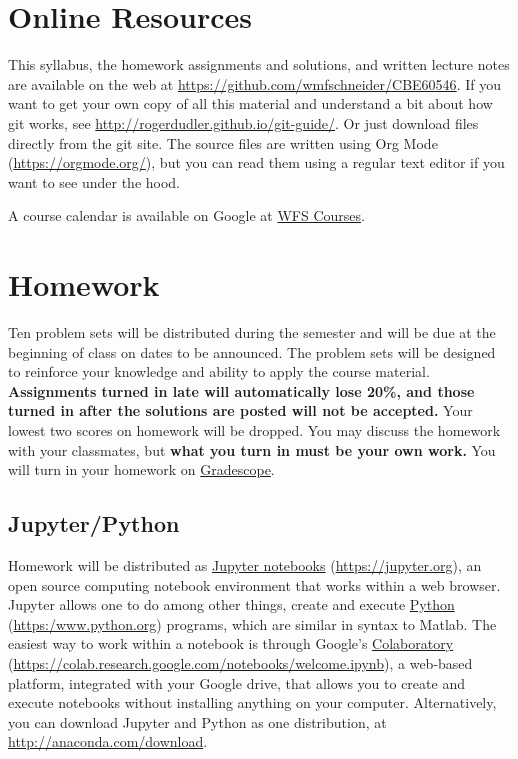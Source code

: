 \documentclass[11pt]{article}
\begin{document}
\section{Online Resources}
\label{sec:orgb748ad3}
This syllabus, the homework assignments and solutions, and written lecture notes are available on the web at \url{https://github.com/wmfschneider/CBE60546}.  If you want to get your own copy of all this material and understand a bit about how git works, see \url{http://rogerdudler.github.io/git-guide/}.  Or just download files directly from the git site. The source files are written using Org Mode (\url{https://orgmode.org/}), but you can read them using a regular text editor if you want to see under the hood.

A course calendar is available on Google at \href{https://calendar.google.com/calendar/b/1?cid=NWJwN2pmMjI5bTdoYmFvM2R0cXM2NjYzOThAZ3JvdXAuY2FsZW5kYXIuZ29vZ2xlLmNvbQ}{WFS Courses}.
\section{Homework}
\label{sec:org1335114}
Ten problem sets will be distributed during the semester and will be due at the beginning of class on dates to be announced. The problem sets will be designed to reinforce your knowledge and ability to apply the course material.  \textbf{Assignments turned in late will automatically lose 20\%, and those turned in after the solutions are posted will not be accepted.}  Your lowest two scores on homework will be dropped.  You may discuss the homework with your classmates, but \textbf{what you turn in must be your own work.} You will turn in your homework on \href{https://www.gradescope.com/courses/933965}{Gradescope}.
\subsection{Jupyter/Python}
\label{sec:orgace344b}
Homework will be distributed as \href{https://jupyter.org/}{Jupyter notebooks} (\url{https://jupyter.org}), an open source computing notebook environment that works within a web browser. Jupyter allows one to do among other things, create and execute \href{https://www.python.org/}{Python} (\url{https:/www.python.org}) programs, which are similar in syntax to Matlab. The easiest way to work within a notebook is through Google's \href{https://colab.research.google.com/notebooks/welcome.ipynb}{Colaboratory} (\url{https://colab.research.google.com/notebooks/welcome.ipynb}), a web-based platform, integrated with your Google drive, that allows you to create and execute notebooks without installing anything on your computer. Alternatively, you can download Jupyter and Python as one distribution, at \url{http://anaconda.com/download}. 
\end{document}
